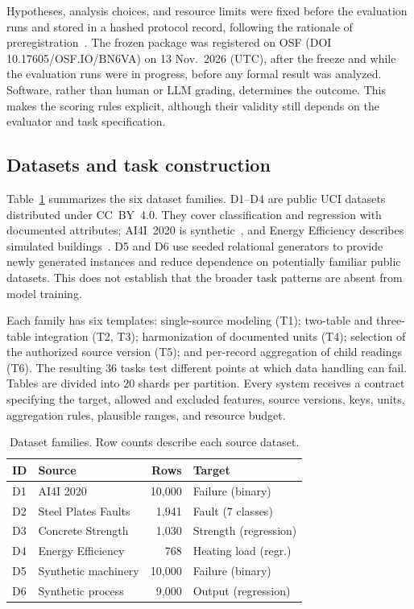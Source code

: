 \documentclass[conference]{IEEEtran}
\begin{document}
Hypotheses, analysis choices, and resource limits were fixed before the evaluation runs and stored in a hashed protocol record, following the rationale of preregistration~\cite{nosek2018prereg}. The frozen package was registered on OSF (DOI 10.17605/OSF.IO/BN6VA) on 13 Nov.\ 2026 (UTC), after the freeze and while the evaluation runs were in progress, before any formal result was analyzed. Software, rather than human or LLM grading, determines the outcome. This makes the scoring rules explicit, although their validity still depends on the evaluator and task specification.

\subsection{Datasets and task construction}
\label{sec:bench}
Table~\ref{tab:data} summarizes the six dataset families. D1--D4 are public UCI datasets distributed under CC~BY~4.0. They cover classification and regression with documented attributes; AI4I~2020 is synthetic~\cite{matzka2020ai4i}, and Energy Efficiency describes simulated buildings~\cite{tsanas2012energy}. D5 and D6 use seeded relational generators to provide newly generated instances and reduce dependence on potentially familiar public datasets. This does not establish that the broader task patterns are absent from model training.

Each family has six templates: single-source modeling (T1); two-table and three-table integration (T2, T3); harmonization of documented units (T4); selection of the authorized source version (T5); and per-record aggregation of child readings (T6). The resulting 36 tasks test different points at which data handling can fail. Tables are divided into 20 shards per partition. Every system receives a contract specifying the target, allowed and excluded features, source versions, keys, units, aggregation rules, plausible ranges, and resource budget.

\begin{table}[t]
\caption{Dataset families. Row counts describe each source dataset.}
\label{tab:data}
\centering\footnotesize\setlength{\tabcolsep}{4pt}
\begin{tabular}{@{}llrl@{}}
\toprule
ID & Source & Rows & Target \\
\midrule
D1 & AI4I 2020~\cite{uci601ai4i} & 10,000 & Failure (binary) \\
D2 & Steel Plates Faults~\cite{uci198steel} & 1,941 & Fault (7 classes) \\
D3 & Concrete Strength~\cite{uci165concrete,yeh1998concrete} & 1,030 & Strength (regression) \\
D4 & Energy Efficiency~\cite{uci242energy} & 768 & Heating load (regr.) \\
D5 & Synthetic machinery & 10,000 & Failure (binary) \\
D6 & Synthetic process & 9,000 & Output (regression) \\
\bottomrule
\end{tabular}
\end{table}
\end{document}
